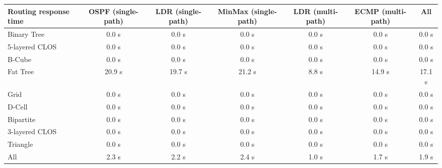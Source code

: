 \begin{tabular}{l|cccccc}
Routing response time & OSPF (single-path) & LDR (single-path) & MinMax (single-path) & LDR (multi-path) & ECMP (multi-path) & All    \\
\hline
Binary Tree           & 0.0 s              & 0.0 s             & 0.0 s                & 0.0 s            & 0.0 s             & 0.0 s  \\
5-layered CLOS        & 0.0 s              & 0.0 s             & 0.0 s                & 0.0 s            & 0.0 s             & 0.0 s  \\
B-Cube                & 0.0 s              & 0.0 s             & 0.0 s                & 0.0 s            & 0.0 s             & 0.0 s  \\
Fat Tree              & 20.9 s             & 19.7 s            & 21.2 s               & 8.8 s            & 14.9 s            & 17.1 s \\
Grid                  & 0.0 s              & 0.0 s             & 0.0 s                & 0.0 s            & 0.0 s             & 0.0 s  \\
D-Cell                & 0.0 s              & 0.0 s             & 0.0 s                & 0.0 s            & 0.0 s             & 0.0 s  \\
Bipartite             & 0.0 s              & 0.0 s             & 0.0 s                & 0.0 s            & 0.0 s             & 0.0 s  \\
3-layered CLOS        & 0.0 s              & 0.0 s             & 0.0 s                & 0.0 s            & 0.0 s             & 0.0 s  \\
Triangle              & 0.0 s              & 0.0 s             & 0.0 s                & 0.0 s            & 0.0 s             & 0.0 s  \\
All                   & 2.3 s              & 2.2 s             & 2.4 s                & 1.0 s            & 1.7 s             & 1.9 s  \\
\end{tabular}